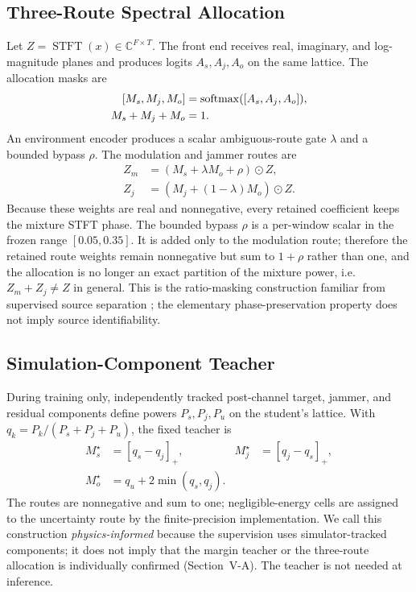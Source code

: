 \documentclass[letterpaper,journal]{IEEEtran}
\newcommand{\STFT}{\operatorname{STFT}}
\newcommand{\softmax}{\operatorname{softmax}}
\begin{document}
\subsection{Three-Route Spectral Allocation}
Let $Z=\STFT(x)\in\mathbb{C}^{F\times T}$. The front end receives real,
imaginary, and log-magnitude planes and produces logits $A_s,A_j,A_o$ on the
same lattice. The allocation masks are
\begin{equation}
\begin{aligned}
\relax[M_s,M_j,M_o]&=\softmax([A_s,A_j,A_o]),\\
M_s+M_j+M_o&=1.
\end{aligned}
\end{equation}
An environment encoder produces a scalar ambiguous-route gate $\lambda$ and a
bounded bypass $\rho$. The modulation and jammer routes are
\begin{align}
Z_m&=(M_s+\lambda M_o+\rho)\odot Z,\\
Z_j&=(M_j+(1-\lambda)M_o)\odot Z.
\end{align}
Because these weights are real and nonnegative, every retained coefficient
keeps the mixture STFT phase. The bounded bypass $\rho$ is a per-window scalar
in the frozen range $[0.05,0.35]$. It is added only to the modulation route;
therefore the retained route weights remain nonnegative but sum to $1+\rho$
rather than one, and the allocation is no longer an exact partition of the
mixture power, i.e.\ $Z_m+Z_j\neq Z$ in general. This is the ratio-masking
construction familiar
from supervised source separation \cite{narayanan2013irm,wang2014targets,
erdogan2015psm,williamson2016cirm}; the elementary phase-preservation
property does not imply source identifiability.

\subsection{Simulation-Component Teacher}
During training only, independently tracked post-channel target, jammer, and
residual components define powers $P_s,P_j,P_u$ on the student's lattice. With
$q_k=P_k/(P_s+P_j+P_u)$, the fixed teacher is
\begin{align}
M_s^\star&=[q_s-q_j]_+, & M_j^\star&=[q_j-q_s]_+,\\
M_o^\star&=q_u+2\min(q_s,q_j).
\label{eq:teacher}
\end{align}
The routes are nonnegative and sum to one; negligible-energy cells are assigned
to the uncertainty route by the finite-precision implementation. We call this
construction \emph{physics-informed} because the supervision uses
simulator-tracked components; it does not imply that the margin teacher or the
three-route allocation is individually confirmed (Section~V-A). The teacher is
not needed at inference.
\end{document}
